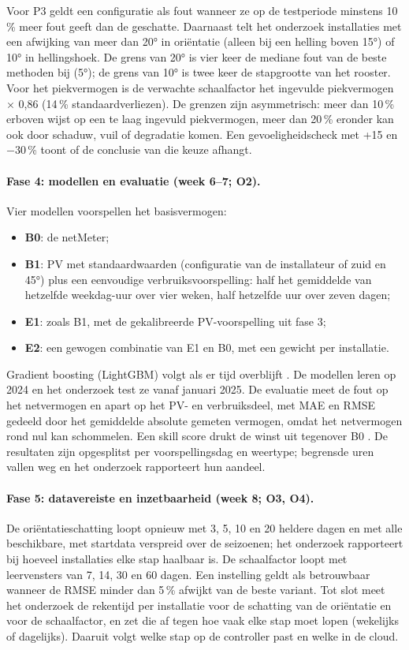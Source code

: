 Voor P3 geldt een configuratie als fout wanneer ze op de testperiode minstens 10\,\% meer fout geeft dan de geschatte. Daarnaast telt het onderzoek installaties met een afwijking van meer dan 20° in oriëntatie (alleen bij een helling boven 15°) of 10° in hellingshoek. De grens van 20° is vier keer de mediane fout van de beste methoden bij \textcite{Perry2023} (5°); de grens van 10° is twee keer de stapgrootte van het rooster. Voor het piekvermogen is de verwachte schaalfactor het ingevulde piekvermogen $\times$ 0,86 (14\,\% standaardverliezen). De grenzen zijn asymmetrisch: meer dan 10\,\% erboven wijst op een te laag ingevuld piekvermogen, meer dan 20\,\% eronder kan ook door schaduw, vuil of degradatie komen. Een gevoeligheidscheck met +15 en $-$30\,\% toont of de conclusie van die keuze afhangt.

\paragraph{Fase 4: modellen en evaluatie (week 6--7; O2).}
Vier modellen voorspellen het basisvermogen:
\begin{itemize}
  \item \textbf{B0}: de netMeter;
  \item \textbf{B1}: PV met standaardwaarden (configuratie van de installateur of zuid en 45°) plus een eenvoudige verbruiksvoorspelling: half het gemiddelde van hetzelfde weekdag-uur over vier weken, half hetzelfde uur over zeven dagen;
  \item \textbf{E1}: zoals B1, met de gekalibreerde PV-voorspelling uit fase 3;
  \item \textbf{E2}: een gewogen combinatie van E1 en B0, met een gewicht per installatie.
\end{itemize}
Gradient boosting (LightGBM) volgt als er tijd overblijft \autocite{Gaboitaolelwe2023}. De modellen leren op 2024 en het onderzoek test ze vanaf januari 2025. De evaluatie meet de fout op het netvermogen en apart op het PV- en verbruiksdeel, met MAE en RMSE gedeeld door het gemiddelde absolute gemeten vermogen, omdat het netvermogen rond nul kan schommelen. Een skill score drukt de winst uit tegenover B0 \autocite{Pandzic2024}. De resultaten zijn opgesplitst per voorspellingsdag en weertype; begrensde uren vallen weg en het onderzoek rapporteert hun aandeel.

\paragraph{Fase 5: datavereiste en inzetbaarheid (week 8; O3, O4).}
De oriëntatieschatting loopt opnieuw met 3, 5, 10 en 20 heldere dagen en met alle beschikbare, met startdata verspreid over de seizoenen; het onderzoek rapporteert bij hoeveel installaties elke stap haalbaar is. De schaalfactor loopt met leervensters van 7, 14, 30 en 60 dagen. Een instelling geldt als betrouwbaar wanneer de RMSE minder dan 5\,\% afwijkt van de beste variant. Tot slot meet het onderzoek de rekentijd per installatie voor de schatting van de oriëntatie en voor de schaalfactor, en zet die af tegen hoe vaak elke stap moet lopen (wekelijks of dagelijks). Daaruit volgt welke stap op de controller past en welke in de cloud.

